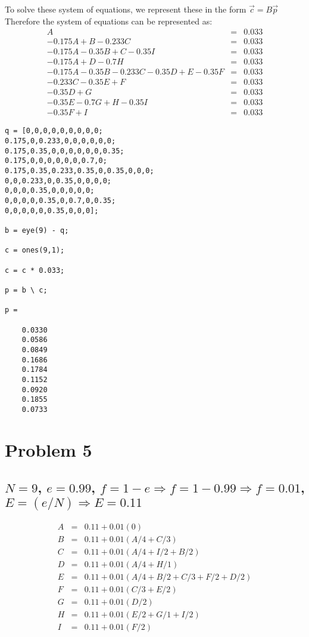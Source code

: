 \documentclass{article}
\begin{document}
To solve these system of equations, we represent these in the form $\vec{c} = B\vec{p}$
Therefore the system of equations can be represented as:
\[
\begin{array}{rcl}A & = & 0.033 \\ -0.175A + B - 0.233C & = & 0.033 \\ -0.175A - 0.35B + C - 0.35I & = & 0.033 \\ -0.175A + D - 0.7H & = & 0.033 \\ -0.175A - 0.35B - 0.233C -0.35D + E - 0.35F & = &0.033 \\ -0.233C - 0.35E + F & = & 0.033 \\ -0.35D + G & = & 0.033 \\ -0.35E - 0.7G + H - 0.35I & = & 0.033 \\ -0.35F + I & = & 0.033 
\end{array}
\]
\begin{lstlisting}
q = [0,0,0,0,0,0,0,0,0;
0.175,0,0.233,0,0,0,0,0,0;
0.175,0.35,0,0,0,0,0,0,0.35;
0.175,0,0,0,0,0,0,0.7,0;
0.175,0.35,0.233,0.35,0,0.35,0,0,0;
0,0,0.233,0,0.35,0,0,0,0;
0,0,0,0.35,0,0,0,0,0;
0,0,0,0,0.35,0,0.7,0,0.35;
0,0,0,0,0,0.35,0,0,0];

b = eye(9) - q;

c = ones(9,1);

c = c * 0.033;

p = b \ c;

p =

    0.0330
    0.0586
    0.0849
    0.1686
    0.1784
    0.1152
    0.0920
    0.1855
    0.0733
\end{lstlisting}

\section[E]{Problem 5}
\subsection{ $N = 9$, $e = 0.99$, $f = 1 - e \Rightarrow f = 1 - 0.99 \Rightarrow f = 0.01$, $E = (e/N) \Rightarrow E = 0.11$}
\[
\begin{array}{rcl}A & = & 0.11 + 0.01(0)\\ B & = & 0.11 + 0.01(A/4 + C/3) \\ C & = & 0.11 + 0.01(A/4 + I/2 + B/2) \\ D & = & 0.11 + 0.01(A/4 + H/1) \\ E & = &0.11 + 0.01(A/4+B/2 + C/3 + F/2 + D/2) \\ F & = & 0.11 + 0.01(C/3 + E/2) \\ G & = & 0.11 + 0.01(D/2) \\ H & = & 0.11 + 0.01(E/2 + G/1 + I/2) \\ I & = & 0.11 + 0.01(F/2)
\end{array}
\]
\end{document}
